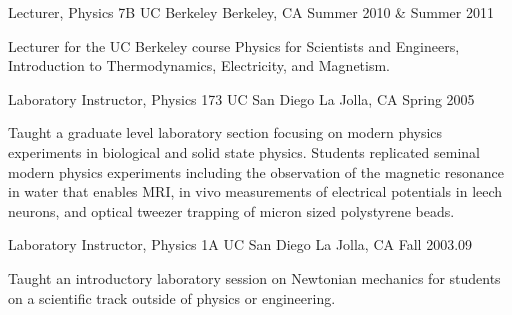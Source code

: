 \begin{cventries}
  \cventry
    {Lecturer, Physics 7B}
    {UC Berkeley}
    {Berkeley, CA}
    {Summer 2010 \& Summer 2011}
    {
      \begin{cvitems}
        Lecturer for the UC Berkeley course Physics for Scientists and Engineers, Introduction to Thermodynamics, Electricity, and Magnetism.
      \end{cvitems}
    }
  \cventry
    {Laboratory Instructor, Physics 173}
    {UC San Diego}
    {La Jolla, CA}
    {Spring 2005}
    {
      \begin{cvitems}
        Taught a graduate level laboratory section focusing on modern physics experiments in biological and solid state physics.  Students replicated seminal modern physics experiments including the observation of the magnetic resonance in water that enables MRI, in vivo measurements of electrical potentials in leech neurons, and optical tweezer trapping of micron sized polystyrene beads. 
      \end{cvitems}
    }
  \cventry
    {Laboratory Instructor, Physics 1A}
    {UC San Diego}
    {La Jolla, CA}
    {Fall 2003.09}
    {
      \begin{cvitems}
        Taught an introductory laboratory session on Newtonian mechanics for students on a scientiﬁc track outside of physics or engineering.
      \end{cvitems}
    }
\end{cventries}
